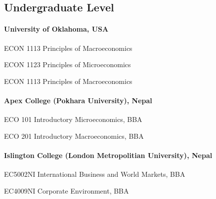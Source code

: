 \subsection{Undergraduate Level}

\paragraph{University of Oklahoma, USA}

{%
    }
{%
    ECON 1113 Principles of Macroeconomics}
{}

{%
    }
{%
    ECON 1123 Principles of Microeconomics}
{}

{%
    }
{%
    ECON 1113 Principles of Macroeconomics}
{}
\vspace{-1em}
\paragraph{Apex College (Pokhara University), Nepal}
{%
    }
{%
    ECO 101 Introductory Microeconomics, BBA}
{}

{%
    }
{%
    ECO 201 Introductory Macroeconomics, BBA}
{}
\vspace{-1em}
\paragraph{Islington College (London Metropolitian University), Nepal}

{%
    }
{%
    EC5002NI International Business and World Markets, BBA}
{}

{%
    }
{%
    EC4009NI Corporate Environment, BBA}
{}

